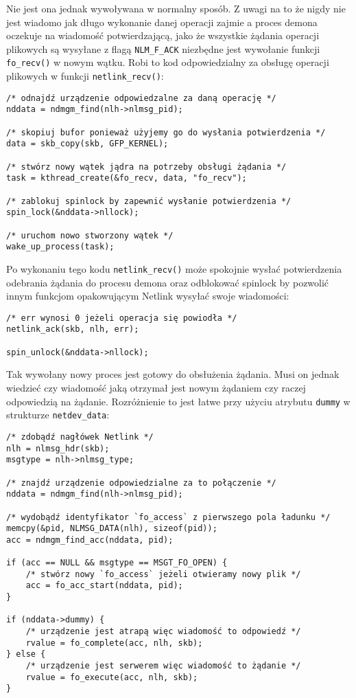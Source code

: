 \documentclass[10pt]{article}
\begin{document}
Nie jest ona jednak wywoływana w normalny sposób. Z uwagi na to że nigdy nie jest wiadomo jak długo wykonanie danej operacji zajmie a proces demona oczekuje na wiadomość potwierdzającą, jako że wszystkie żądania operacji plikowych są wysyłane z flagą \texttt{NLM\_F\_ACK} niezbędne jest wywołanie funkcji \texttt{fo\_recv()} w nowym wątku. Robi to kod odpowiedzialny za obsługę operacji plikowych w funkcji \texttt{netlink\_recv()}:

\begin{verbatim}
/* odnajdź urządzenie odpowiedzalne za daną operację */
nddata = ndmgm_find(nlh->nlmsg_pid);

/* skopiuj bufor ponieważ użyjemy go do wysłania potwierdzenia */
data = skb_copy(skb, GFP_KERNEL);

/* stwórz nowy wątek jądra na potrzeby obsługi żądania */
task = kthread_create(&fo_recv, data, "fo_recv");

/* zablokuj spinlock by zapewnić wysłanie potwierdzenia */
spin_lock(&nddata->nllock);

/* uruchom nowo stworzony wątek */
wake_up_process(task);
\end{verbatim}

Po wykonaniu tego kodu \texttt{netlink\_recv()} może spokojnie wysłać potwierdzenia odebrania żądania do procesu demona oraz odblokować spinlock by pozwolić innym funkcjom opakowującym Netlink wysyłać swoje wiadomości:

\begin{verbatim}
/* err wynosi 0 jeżeli operacja się powiodła */
netlink_ack(skb, nlh, err);

spin_unlock(&nddata->nllock);
\end{verbatim}

Tak wywołany nowy proces jest gotowy do obsłużenia żądania. Musi on jednak wiedzieć czy wiadomość jaką otrzymał jest nowym żądaniem czy raczej odpowiedzią na żądanie. Rozróżnienie to jest łatwe przy użyciu atrybutu \texttt{dummy} w strukturze \texttt{netdev\_data}:

\begin{verbatim}
/* zdobądź nagłówek Netlink */
nlh = nlmsg_hdr(skb);
msgtype = nlh->nlmsg_type;

/* znajdź urządzenie odpowiedzialne za to połączenie */
nddata = ndmgm_find(nlh->nlmsg_pid);

/* wydobądź identyfikator `fo_access` z pierwszego pola ładunku */
memcpy(&pid, NLMSG_DATA(nlh), sizeof(pid));
acc = ndmgm_find_acc(nddata, pid);

if (acc == NULL && msgtype == MSGT_FO_OPEN) {
    /* stwórz nowy `fo_access` jeżeli otwieramy nowy plik */
    acc = fo_acc_start(nddata, pid);
}

if (nddata->dummy) {
    /* urządzenie jest atrapą więc wiadomość to odpowiedź */
    rvalue = fo_complete(acc, nlh, skb);
} else {
    /* urządzenie jest serwerem więc wiadomość to żądanie */
    rvalue = fo_execute(acc, nlh, skb);
}
\end{verbatim}
\end{document}
